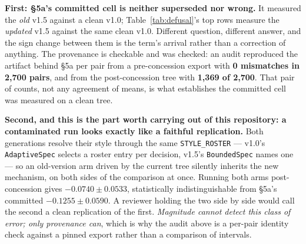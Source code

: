 \documentclass[11pt]{article}
\newcommand{\code}[1]{\texttt{#1}}
\begin{document}
\textbf{First: \S5a's committed cell is neither superseded nor wrong.} It measured the
\emph{old} v1.5 against a clean v1.0; Table~\ref{tab:defusal}'s top rows measure the
\emph{updated} v1.5 against the same clean v1.0. Different question, different answer, and the
sign change between them is the term's arrival rather than a correction of anything. The
provenance is checkable and was checked: an audit reproduced the artifact behind \S5a per pair
from a pre-concession export with \textbf{0 mismatches in 2{,}700 pairs}, and from the
post-concession tree with \textbf{1{,}369 of 2{,}700}. That pair of counts, not any agreement of
means, is what establishes the committed cell was measured on a clean tree.

\textbf{Second, and this is the part worth carrying out of this repository: a contaminated run
looks exactly like a faithful replication.} Both generations resolve their style through the same
\code{STYLE\_ROSTER} --- v1.0's \code{AdaptiveSpec} selects a roster entry per decision, v1.5's
\code{BoundedSpec} names one --- so an old-version arm driven by the current tree silently
inherits the new mechanism, on both sides of the comparison at once. Running both arms
post-concession gives $-0.0740 \pm 0.0533$, statistically indistinguishable from \S5a's committed
$-0.1255 \pm 0.0590$. A reviewer holding the two side by side would call the second a clean
replication of the first. \emph{Magnitude cannot detect this class of error; only provenance
can}, which is why the audit above is a per-pair identity check against a pinned export rather
than a comparison of intervals.
\end{document}
